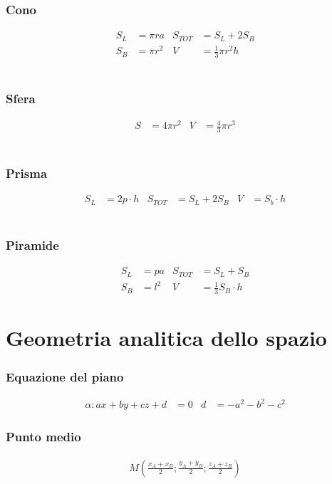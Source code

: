 \documentclass[a4paper]{article}
\begin{document}
	\subsubsection{Cono}
	\begin{align*}
		S_L & = \pi r a & S_{TOT} & = S_L + 2S_B            \\
		S_B & = \pi r^2 & V       & = \frac{1}{3} \pi r^2 h
	\end{align*}
	\\
	\subsubsection{Sfera}
	\begin{align*}
		S &= 4\pi r^2 & V &= \frac{4}{3} \pi r^3
	\end{align*}
	\\
	\subsubsection{Prisma}
	\begin{align*}
		S_L &= 2p \cdot h	&	S_{TOT} &= S_L +2S_B
		&			V &= S_b \cdot h
	\end{align*}
	\\
	\subsubsection{Piramide}
	\begin{align*}
		S_L &= pa	&	S_{TOT} &= S_L + S_B\\
		S_B &= l^2	&	V &= \frac{1}{3} S_B \cdot h
	\end{align*}
	
	\newpage
	\section{Geometria analitica dello spazio}

	\subsubsection{Equazione del piano}
	\begin{align*}
		\alpha : ax +by +cz+ d &= 0			&			d &= -a^2-b^2-c^2
	\end{align*}

	\subsubsection{Punto medio}
	\begin{align*}
		M \left( \frac{x_A + x_B}{2} ; \frac{y_A + y_B}{2} ; \frac{z_A + z_B}{2} \right)
	\end{align*}
\end{document}
